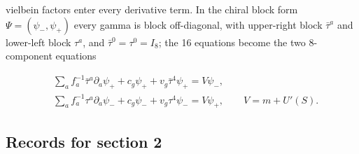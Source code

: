 \documentclass[11pt]{article}
\begin{document}
vielbein factors enter every derivative term. In the chiral block form $\Psi = (\psi_-, \psi_+)$ every gamma is block off-diagonal, with upper-right block $\bar\tau^a$ and lower-left block $\tau^a$, and $\bar\tau^0 = \tau^0 = I_8$; the 16 equations become the two 8-component equations

\[
\begin{aligned}
&\sum_a f_a^{-1}\bar\tau^a\partial_a\psi_+ + c_g\psi_+ + v_g\bar\tau^4\psi_+ = V\psi_-,\\
&\sum_a f_a^{-1}\tau^a\partial_a\psi_- + c_g\psi_- + v_g\tau^4\psi_- = V\psi_+,\qquad V = m + U'(S).
\end{aligned}
\]

\subsection{Records for section 2}
\end{document}
